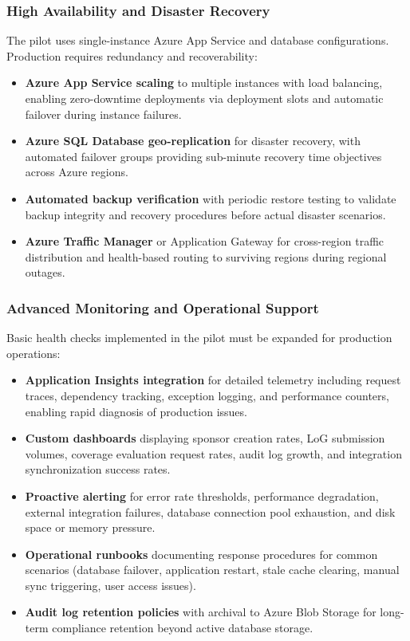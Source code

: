 \subsubsection{High Availability and Disaster Recovery}

The pilot uses single-instance Azure App Service and database configurations. Production requires redundancy and recoverability:

\begin{itemize}
    \item \textbf{Azure App Service scaling} to multiple instances with load balancing, enabling zero-downtime deployments via deployment slots and automatic failover during instance failures.
    \item \textbf{Azure SQL Database geo-replication} for disaster recovery, with automated failover groups providing sub-minute recovery time objectives across Azure regions.
    \item \textbf{Automated backup verification} with periodic restore testing to validate backup integrity and recovery procedures before actual disaster scenarios.
    \item \textbf{Azure Traffic Manager} or Application Gateway for cross-region traffic distribution and health-based routing to surviving regions during regional outages.
\end{itemize}

\subsubsection{Advanced Monitoring and Operational Support}

Basic health checks implemented in the pilot must be expanded for production operations:

\begin{itemize}
    \item \textbf{Application Insights integration} for detailed telemetry including request traces, dependency tracking, exception logging, and performance counters, enabling rapid diagnosis of production issues.
    \item \textbf{Custom dashboards} displaying sponsor creation rates, LoG submission volumes, coverage evaluation request rates, audit log growth, and integration synchronization success rates.
    \item \textbf{Proactive alerting} for error rate thresholds, performance degradation, external integration failures, database connection pool exhaustion, and disk space or memory pressure.
    \item \textbf{Operational runbooks} documenting response procedures for common scenarios (database failover, application restart, stale cache clearing, manual sync triggering, user access issues).
    \item \textbf{Audit log retention policies} with archival to Azure Blob Storage for long-term compliance retention beyond active database storage.
\end{itemize}


